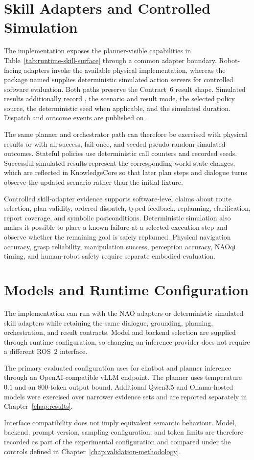 \section{Skill Adapters and Controlled Simulation}

The implementation exposes the planner-visible capabilities in Table~\ref{tab:runtime-skill-surface} through a common adapter boundary. Robot-facing adapters invoke the available physical implementation, whereas the package named  supplies deterministic simulated action servers for controlled software evaluation. Both paths preserve the Contract~6 result shape. Simulated results additionally record , the scenario and result mode, the selected policy source, the deterministic seed when applicable, and the simulated duration. Dispatch and outcome events are published on .

The same planner and orchestrator path can therefore be exercised with physical results or with all-success, fail-once, and seeded pseudo-random simulated outcomes. Stateful policies use deterministic call counters and recorded seeds. Successful simulated results represent the corresponding world-state changes, which are reflected in KnowledgeCore so that later plan steps and dialogue turns observe the updated scenario rather than the initial fixture.

Controlled skill-adapter evidence supports software-level claims about route selection, plan validity, ordered dispatch, typed feedback, replanning, clarification, report coverage, and symbolic postconditions. Deterministic simulation also makes it possible to place a known failure at a selected execution step and observe whether the remaining goal is safely replanned. Physical navigation accuracy, grasp reliability, manipulation success, perception accuracy, NAOqi timing, and human-robot safety require separate embodied evaluation.

\section{Models and Runtime Configuration}

The implementation can run with the NAO adapters or deterministic simulated skill adapters while retaining the same dialogue, grounding, planning, orchestration, and result contracts. Model and backend selection are supplied through runtime configuration, so changing an inference provider does not require a different ROS~2 interface.

The primary evaluated configuration uses  for chatbot and planner inference through an OpenAI-compatible vLLM endpoint. The planner uses temperature \(0.1\) and an 800-token output bound. Additional Qwen3.5 and Ollama-hosted models were exercised over narrower evidence sets and are reported separately in Chapter~\ref{chap:results}.

Interface compatibility does not imply equivalent semantic behaviour. Model, backend, prompt version, sampling configuration, and token limits are therefore recorded as part of the experimental configuration and compared under the controls defined in Chapter~\ref{chap:validation-methodology}.

